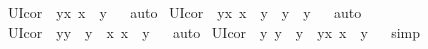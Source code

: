 \begin{isabellebody}
\isanewline
{}\isamarkupfalse%
\ UI{\isacharunderscore}cor{}\ {\isacharcolon}\ {\isachardoublequoteopen}\isactrlbold {\isasymforall}y{\isachardot}{\isacharparenleft}{\isacharparenleft}\isactrlbold {\isasymforall}x{\isachardot}\ {\isasymPhi}{\isacharparenleft}x{\isacharparenright}{\isacharparenright}\ \isactrlbold {\isasymrightarrow}\ {\isasymPhi}{\isacharparenleft}y{\isacharparenright}{\isacharparenright}{\isachardoublequoteclose}%
\isadelimproof
\ %
\endisadelimproof
%
\isatagproof
{}\isamarkupfalse%
\ auto%
\endisatagproof
{\isafoldproof}%
%
\isadelimproof
%
\endisadelimproof
\isanewline
{}\isamarkupfalse%
\ UI{\isacharunderscore}cor{}\ {\isacharcolon}\ {\isachardoublequoteopen}\isactrlbold {\isasymforall}y{\isachardot}{\isacharparenleft}{\isacharparenleft}\isactrlbold {\isasymforall}x{\isachardot}\ \isactrlbold {\isasymnot}{\isacharparenleft}x\ \isactrlbold {\isacharequal}\ y{\isacharparenright}{\isacharparenright}\ \isactrlbold {\isasymrightarrow}\ \isactrlbold {\isasymnot}{\isacharparenleft}y\ \isactrlbold {\isacharequal}\ y{\isacharparenright}{\isacharparenright}{\isachardoublequoteclose}%
\isadelimproof
\ %
\endisadelimproof
%
\isatagproof
{}\isamarkupfalse%
\ auto%
\endisatagproof
{\isafoldproof}%
%
\isadelimproof
%
\endisadelimproof
\isanewline
{}\isamarkupfalse%
\ UI{\isacharunderscore}cor{}\ {\isacharcolon}\ {\isachardoublequoteopen}\isactrlbold {\isasymforall}y{\isachardot}{\isacharparenleft}{\isacharparenleft}y\ \isactrlbold {\isacharequal}\ y{\isacharparenright}\ \isactrlbold {\isasymrightarrow}\ {\isacharparenleft}\isactrlbold {\isasymexists}x{\isachardot}\ x\ \isactrlbold {\isacharequal}\ y{\isacharparenright}{\isacharparenright}{\isachardoublequoteclose}%
\isadelimproof
\ %
\endisadelimproof
%
\isatagproof
{}\isamarkupfalse%
\ auto%
\endisatagproof
{\isafoldproof}%
%
\isadelimproof
%
\endisadelimproof
\isanewline
{}\isamarkupfalse%
\ UI{\isacharunderscore}cor{}\ {\isacharcolon}\ {\isachardoublequoteopen}{\isacharparenleft}\isactrlbold {\isasymforall}y{\isachardot}\ y\ \isactrlbold {\isacharequal}\ y{\isacharparenright}\ \isactrlbold {\isasymrightarrow}\ {\isacharparenleft}\isactrlbold {\isasymforall}y{\isachardot}\isactrlbold {\isasymexists}x{\isachardot}\ x\ \isactrlbold {\isacharequal}\ y{\isacharparenright}{\isachardoublequoteclose}%
\isadelimproof
\ %
\endisadelimproof
%
\isatagproof
{}\isamarkupfalse%
\ simp%
\endisatagproof
{\isafoldproof}%
%
\isadelimproof
%
\endisadelimproof

\end{isabellebody}
